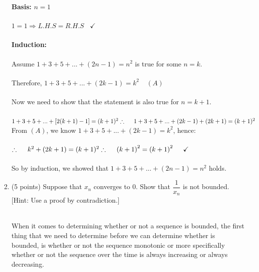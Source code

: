 \documentclass[fleqn]{article}
\begin{document}
\begin{enumerate}
      \textcolor{hwColor}{
        \textbf{Basis: $n=1$}
        \\
        \\
        $
          1=1 \Longrightarrow L.H.S=R.H.S ~~~~ \checkmark 
        $
        \\
        \\
        \textbf{Induction:}
        \\
        \\
        Assume $1+3+5+...+(2n-1)=n^2$ is true for some $n=k$. 
        \\
        \\
        Therefore, $1+3+5+...+(2k-1)=k^2 ~~~~~ (A)$
        \\
        \\
        Now we need to show that the statement is also true for $n=k+1$.
        \\
        \\
        $
          1+3+5+...+ \left[2(k+1)-1\right]=(k+1)^2
          \\
          \\
          \\
          \therefore ~~~~ 1+3+5+...+\left(2k-1\right)+\left(2k+1\right)=(k+1)^2
          \\
          \\
          \\
        $
        From $(A)$, we know $1+3+5+...+(2k-1)=k^2$, hence:
        \\
        \\
        $
          \therefore ~~~~ k^2+\left(2k+1\right)=(k+1)^2
          \\
          \\
          \\
          \therefore ~~~~ \left(k+1\right)^2=\left(k+1\right)^2 ~~~~ \checkmark
        $
        \\
        \\
        So by induction, we showed that $1+3+5+...+(2n-1)=n^2$ holds.
      }


    \item (5 points) Suppose that $x_n$ converges to $0$. Show that $\dfrac{1}{x_n}$ is not bounded. 
    [Hint: Use a proof by contradiction.]

      \textcolor{hwColor}{
        \\
        When it comes to determining whether or not a sequence is bounded, the first thing that we need to determine before 
        we can determine whether is bounded, is whether or not the sequence monotonic or more specifically whether or not the sequence
        over the time is always increasing or always decreasing. 
      }



\end{enumerate}
\end{document}

